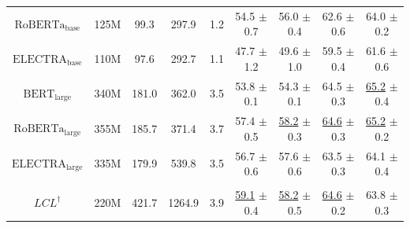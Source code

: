 \begin{table}[t]
\begin{tabular}{c c c c c | c c c c }
         \multicolumn{1}{c}{$\mathrm{RoBERTa}_\mathrm{base}$} & 125M & 99.3 & 297.9 & 1.2 & 54.5 \footnotesize{$\pm$0.7}  &  \multicolumn{1}{c}{56.0 \footnotesize{$\pm$0.4}}  &  62.6 \footnotesize{$\pm$0.6} &  \multicolumn{1}{c}{64.0 \footnotesize{$\pm$0.2}}\\
         
         \multicolumn{1}{c}{$\mathrm{ELECTRA}_\mathrm{base}$} & 110M & 97.6 & 292.7 & 1.1 & 47.7 \footnotesize{$\pm$1.2} & \multicolumn{1}{c}{49.6 \footnotesize{$\pm$1.0}} & 59.5 \footnotesize{$\pm$0.4} & \multicolumn{1}{c}{61.6 \footnotesize{$\pm$0.6}} \\
         
         \multicolumn{1}{c}{$\mathrm{BERT}_\mathrm{large}$} & 340M & 181.0 & 362.0 & 3.5 & 53.8 \footnotesize{$\pm$0.1} & \multicolumn{1}{c}{54.3 \footnotesize{$\pm$0.1}} & 64.5 \footnotesize{$\pm$0.3} & \multicolumn{1}{c}{\underline{65.2} \footnotesize{$\pm$0.4}} \\

         \multicolumn{1}{c}{$\mathrm{RoBERTa}_\mathrm{large}$} & 355M & 185.7 & 371.4 & 3.7 & 57.4 \footnotesize{$\pm$0.5}  &  \multicolumn{1}{c}{\underline{58.2} \footnotesize{$\pm$0.3}}  &  \underline{64.6} \footnotesize{$\pm$0.3} &  \multicolumn{1}{c}{\underline{65.2} \footnotesize{$\pm$0.2}}\\
         
         \multicolumn{1}{c}{$\mathrm{ELECTRA}_\mathrm{large}$} & 335M & 179.9 & 539.8 & 3.5 & 56.7 \footnotesize{$\pm$0.6} & \multicolumn{1}{c}{57.6 \footnotesize{$\pm$0.6}} & 63.5 \footnotesize{$\pm$0.3} & \multicolumn{1}{c}{64.1 \footnotesize{$\pm$0.4}} \\
         \hline
                  
         
         \\[-8pt]
         \multicolumn{1}{c}{$LCL^\dag$} & 220M & 421.7 & 1264.9 & 3.9 & \underline{59.1} \footnotesize{$\pm$0.4} & \multicolumn{1}{c}{\underline{58.2} \footnotesize{$\pm$0.5}} & \underline{64.6} \footnotesize{$\pm$0.2} & \multicolumn{1}{c}{63.8 \footnotesize{$\pm$0.3}}\\
         

\end{tabular}
\end{table}
